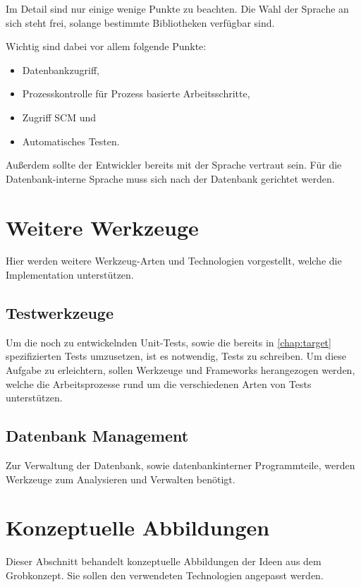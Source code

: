 Im Detail sind nur einige wenige Punkte zu beachten.
Die Wahl der Sprache an sich steht frei,
solange bestimmte Bibliotheken verf\"ugbar sind.

Wichtig sind dabei vor allem folgende Punkte:
\begin{itemize}
    \item Datenbankzugriff,
    \item Prozesskontrolle für Prozess basierte Arbeitsschritte,
    \item Zugriff SCM und
    \item Automatisches Testen.
\end{itemize}

Außerdem sollte der Entwickler bereits mit der Sprache vertraut sein.
Für die Datenbank-interne Sprache muss sich nach der Datenbank gerichtet werden.


\section{Weitere Werkzeuge}
\label{sec:tech:tools}

Hier werden weitere Werkzeug-Arten und Technologien vorgestellt,
welche die Implementation unterstützen.

\subsection{Testwerkzeuge}

Um die noch zu entwickelnden Unit-Tests,
sowie die bereits in \cref{chap:target} spezifizierten Tests umzusetzen,
ist es notwendig, Tests zu schreiben. Um diese Aufgabe zu erleichtern,
sollen Werkzeuge und Frameworks herangezogen werden,
welche die Arbeitsprozesse rund um die verschiedenen Arten von Tests unterstützen.

\subsection{Datenbank Management}

Zur Verwaltung der Datenbank, sowie datenbankinterner Programmteile,
werden Werkzeuge zum Analysieren und Verwalten benötigt.


\section{Konzeptuelle Abbildungen}
\label{sec:tech:konzeptabbildung}

Dieser Abschnitt behandelt konzeptuelle Abbildungen der Ideen aus dem Grobkonzept.
Sie sollen den verwendeten Technologien angepasst werden.

